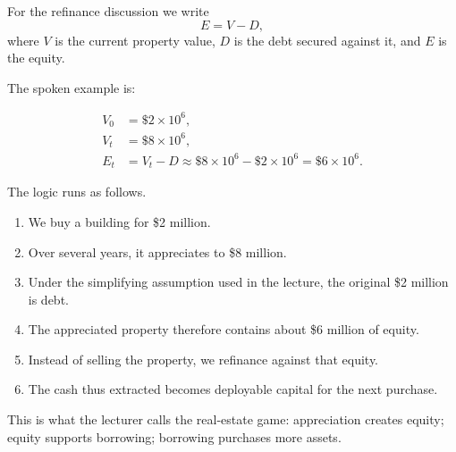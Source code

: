 \begin{definition}
For the refinance discussion we write
\begin{equation}
E = V - D,
\end{equation}
where \(V\) is the current property value, \(D\) is the debt secured against it, and \(E\) is the equity.
\end{definition}

The spoken example is:

\begin{align}
V_0 &= \$2 \times 10^6,\\
V_t &= \$8 \times 10^6,\\
E_t &= V_t - D \approx \$8 \times 10^6 - \$2 \times 10^6 = \$6 \times 10^6.
\end{align}

The logic runs as follows.
\begin{enumerate}
\item We buy a building for \$2 million.
\item Over several years, it appreciates to \$8 million.
\item Under the simplifying assumption used in the lecture, the original \$2 million is debt.
\item The appreciated property therefore contains about \$6 million of equity.
\item Instead of selling the property, we refinance against that equity.
\item The cash thus extracted becomes deployable capital for the next purchase.
\end{enumerate}

This is what the lecturer calls the real-estate game: appreciation creates equity; equity supports borrowing; borrowing purchases more assets.

\begin{figure}
\centering
{}
\end{figure}

